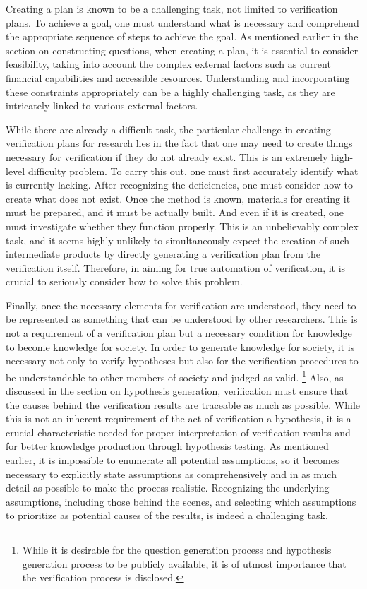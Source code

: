 \documentclass{book}
\begin{document}
Creating a plan is known to be a challenging task, not limited to verification plans. To achieve a goal, one must understand what is necessary and comprehend the appropriate sequence of steps to achieve the goal. As mentioned earlier in the section on constructing questions, when creating a plan, it is essential to consider feasibility, taking into account the complex external factors such as current financial capabilities and accessible resources. Understanding and incorporating these constraints appropriately can be a highly challenging task, as they are intricately linked to various external factors.

While there are already a difficult task, the particular challenge in creating verification plans for research lies in the fact that one may need to create things necessary for verification if they do not already exist. This is an extremely high-level difficulty problem. To carry this out, one must first accurately identify what is currently lacking. After recognizing the deficiencies, one must consider how to create what does not exist. Once the method is known, materials for creating it must be prepared, and it must be actually built. And even if it is created, one must investigate whether they function properly. This is an unbelievably complex task, and it seems highly unlikely to simultaneously expect the creation of such intermediate products by directly generating a verification plan from the verification itself. Therefore, in aiming for true automation of verification, it is crucial to seriously consider how to solve this problem.


Finally, once the necessary elements for verification are understood, they need to be represented as something that can be understood by other researchers. This is not a requirement of a verification plan but a necessary condition for knowledge to become knowledge for society. In order to generate knowledge for society, it is necessary not only to verify hypotheses but also for the verification procedures to be understandable to other members of society and judged as valid. \footnote{
While it is desirable for the question generation process and hypothesis generation process to be publicly available, it is of utmost importance that the verification process is disclosed. 
} Also, as discussed in the section on hypothesis generation, verification must ensure that the causes behind the verification results are traceable as much as possible. While this is not an inherent requirement of the act of verification a hypothesis, it is a crucial characteristic needed for proper interpretation of verification results and for better knowledge production through hypothesis testing. As mentioned earlier, it is impossible to enumerate all potential assumptions, so it becomes necessary to explicitly state assumptions as comprehensively and in as much detail as possible to make the process realistic. Recognizing the underlying assumptions, including those behind the scenes, and selecting which assumptions to prioritize as potential causes of the results, is indeed a challenging task.
\end{document}
